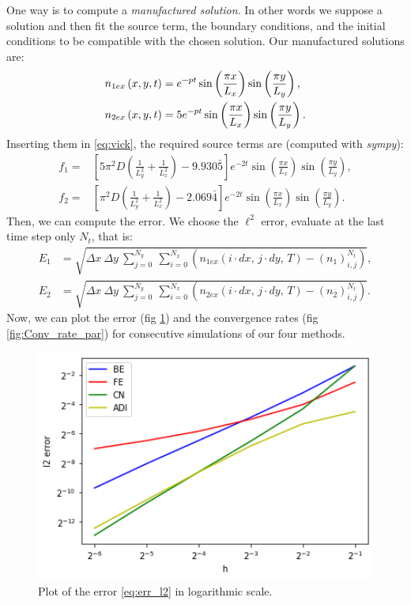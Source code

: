One way is to compute a \textit{manufactured solution}. In other words
we suppose a solution and then fit the source term, the boundary conditions,
and the initial conditions to be compatible with the chosen solution.
Our manufactured solutions are:
\begin{align*}
n_{1ex}\left(x,y,t\right) & =e^{\text{\textminus}pt}\sin\left(\frac{\pi x}{L_{x}}\right)\sin\left(\frac{\pi y}{L_{y}}\right),\\
n_{2ex}\left(x,y,t\right) & =5e^{\text{\textminus}pt}\sin\left(\frac{\pi x}{L_{x}}\right)\sin\left(\frac{\pi y}{L_{y}}\right).
\end{align*}
Inserting them in \ref{eq:vick}, the required source terms are (computed
with \textit{sympy}):
\begin{align*}
f_{1}= & \left[5\pi^{2}D\left(\frac{1}{L_{y}^{2}}+\frac{1}{L_{x}^{2}}\right)-9.930\bar{5}\right]e^{-2t}\sin\left(\frac{\pi x}{L_{x}}\right)\sin\left(\frac{\pi y}{L_{y}}\right),\\
f_{2}= & \left[\pi^{2}D\left(\frac{1}{L_{y}^{2}}+\frac{1}{L_{x}^{2}}\right)-2.069\bar{4}\right]e^{-2t}\sin\left(\frac{\pi x}{L_{x}}\right)\sin\left(\frac{\pi y}{L_{y}}\right).
\end{align*}
Then, we can compute the error. We choose the $\ell^{2}$ error, evaluate
at the last time step only $N_{t}$, that is:
\begin{align}
E_{1} & =\sqrt{\Delta x\:\Delta y\:\sum_{j=0}^{N_{y}}\:\sum_{i=0}^{N_{x}}\left(n_{1ex}\left(i\cdot dx,\,j\cdot dy,\,T\right)-\left(n_{1}\right)_{i,j}^{N_{t}}\right)},\label{eq:err_l2}\\
E_{2} & =\sqrt{\Delta x\:\Delta y\:\sum_{j=0}^{N_{y}}\:\sum_{i=0}^{N_{x}}\left(n_{2ex}\left(i\cdot dx,\,j\cdot dy,\,T\right)-\left(n_{2}\right)_{i,j}^{N_{t}}\right)}.\nonumber 
\end{align}
 Now, we can plot the error (fig \ref{fig:Err_par}) and the convergence
rates (fig \ref{fig:Conv_rate_par}) for consecutive simulations of
our four methods.

\begin{figure}[H]
\noindent \centering{}\includegraphics[width=1\textwidth]{immagini/validation_log-error}\caption{\label{fig:Err_par}Plot of the error \ref{eq:err_l2} in logarithmic
scale.}
\end{figure}

